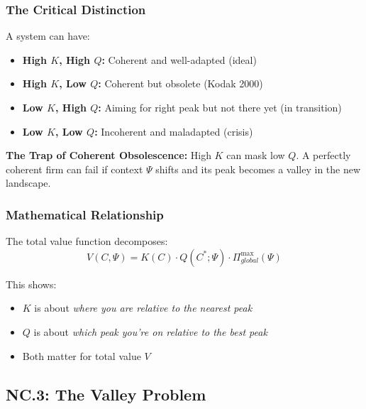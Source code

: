\subsubsection{The Critical Distinction}

\begin{tcolorbox}[colback=red!5!white, colframe=red!75!black,
    title=\textbf{Critical Insight: $K$ and $Q$ Are Independent}]

A system can have:
\begin{itemize}
\item \textbf{High $K$, High $Q$:} Coherent and well-adapted (ideal)
\item \textbf{High $K$, Low $Q$:} Coherent but obsolete (Kodak 2000)
\item \textbf{Low $K$, High $Q$:} Aiming for right peak but not there yet (in transition)
\item \textbf{Low $K$, Low $Q$:} Incoherent and maladapted (crisis)
\end{itemize}

\textbf{The Trap of Coherent Obsolescence:} High $K$ can mask low $Q$. A perfectly coherent firm can fail if context $\Psi$ shifts and its peak becomes a valley in the new landscape.
\end{tcolorbox}

\subsubsection{Mathematical Relationship}

The total value function decomposes:
\begin{equation}
V(C, \Psi) = K(C) \cdot Q(C^*; \Psi) \cdot \Pi^{\max}_{global}(\Psi)
\end{equation}

This shows:
\begin{itemize}
\item $K$ is about \textit{where you are relative to the nearest peak}
\item $Q$ is about \textit{which peak you're on relative to the best peak}
\item Both matter for total value $V$
\end{itemize}


\subsection{NC.3: The Valley Problem}
\label{sec:nc-valley}

